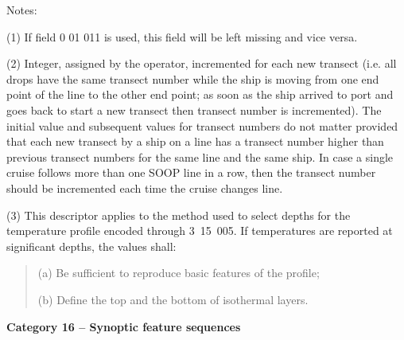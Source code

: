 Notes:

(1) If field 0 01 011 is used, this field will be left missing and vice versa.

(2) Integer, assigned by the operator, incremented for each new transect (i.e. all drops have the same transect number while the ship is moving from one end point of the line to the other end point; as soon as the ship arrived to port and goes back to start a new transect then transect number is incremented). The initial value and subsequent values for transect numbers do not matter provided that each new transect by a ship on a line has a transect number higher than previous transect numbers for the same line and the same ship. In case a single cruise follows more than one SOOP line in a row, then the transect number should be incremented each time the cruise changes line.

(3) This descriptor applies to the method used to select depths for the temperature profile encoded through 3~15~005. If temperatures are reported at signiﬁcant depths, the values shall:

\begin{quote}
(a) Be sufficient to reproduce basic features of the profile;

(b) Define the top and the bottom of isothermal layers.
\end{quote}

\textbf{Category 16 -- Synoptic feature sequences}

